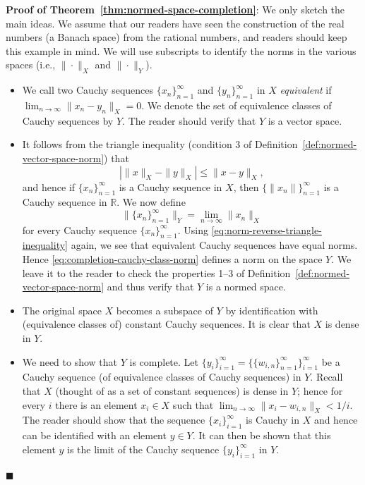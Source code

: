 \begingroup
\renewenvironment{Proof}{\vspace{0.1cm}\par}
{\par\hfill$\blacksquare$\par\vspace{0.1cm}}
\begin{Proof}
\textbf{Proof of Theorem~\ref{thm:normed-space-completion}}: We only sketch the main ideas. We assume that our readers have seen the construction of the real numbers (a Banach space) from the rational numbers, and readers should keep this example in mind. We will use subscripts to identify the norms in the various spaces (i.e., $\|\cdot\|_X$ and $\|\cdot\|_Y$).\begin{itemize}\item We call two Cauchy sequences $\{x_n\}_{n=1}^\infty$ and $\{y_n\}_{n=1}^\infty$ in $X$ \emph{equivalent} if $\lim_{n\to\infty}\|x_n-y_n\|_X=0$. We denote the set of equivalence classes of Cauchy sequences by $Y$. The reader should verify that $Y$ is a vector space.
\item It follows from the triangle inequality (condition 3 of Definition~\ref{def:normed-vector-space-norm}) that
\begin{equation}\label{eq:norm-reverse-triangle-inequality}
|\|x\|_X-\|y\|_X|\leq\|x-y\|_X,
\end{equation}
and hence if $\{x_n\}_{n=1}^\infty$ is a Cauchy sequence in $X$, then $\{\|x_n\|\}_{n=1}^\infty$ is a Cauchy sequence in $\mathbb{R}$. We now define
\begin{equation}\label{eq:completion-cauchy-class-norm}
\|\{x_n\}_{n=1}^\infty\|_Y=\lim_{n\to\infty}\|x_n\|_X
\end{equation}
for every Cauchy sequence $\{x_n\}_{n=1}^\infty$. Using \eqref{eq:norm-reverse-triangle-inequality} again, we see that equivalent Cauchy sequences have equal norms. Hence \eqref{eq:completion-cauchy-class-norm} defines a norm on the space $Y$. We leave it to the reader to check the properties 1--3 of Definition~\ref{def:normed-vector-space-norm} and thus verify that $Y$ is a normed space.
\item The original space $X$ becomes a subspace of $Y$ by identification with (equivalence classes of) constant Cauchy sequences. It is clear that $X$ is dense in $Y$.
\item We need to show that $Y$ is complete. Let $\{y_i\}_{i=1}^\infty=\{\{w_{i,n}\}_{n=1}^\infty\}_{i=1}^\infty$ be a Cauchy sequence (of equivalence classes of Cauchy sequences) in $Y$. Recall that $X$ (thought of as a set of constant sequences) is dense in $Y$; hence for every $i$ there is an element $x_i\in X$ such that $\lim_{n\to\infty}\|x_i-w_{i,n}\|_X<1/i$. The reader should show that the sequence $\{x_i\}_{i=1}^\infty$ is Cauchy in $X$ and hence can be identified with an element $y\in Y$. It can then be shown that this element $y$ is the limit of the Cauchy sequence $\{y_i\}_{i=1}^\infty$ in $Y$.

\end{itemize}
\end{Proof}
